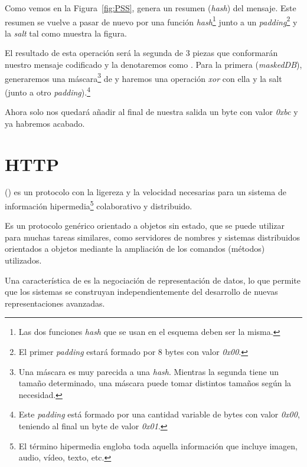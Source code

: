  Como vemos en la Figura~\ref{fig:PSS},  genera un resumen (\emph{hash}) del mensaje.
 Este resumen se vuelve a pasar de nuevo por una función \emph{hash}\footnote{Las dos funciones \emph{hash} que se usan en el esquema deben ser la misma.} junto a un \emph{padding}\footnote{El primer \emph{padding} estará formado por 8 bytes con valor \emph{0x00}.} y la \emph{salt} tal como muestra la figura.

 El resultado de esta operación será la segunda de 3 piezas que conformarán nuestro mensaje codificado y la denotaremos como .
 Para la primera (\emph{maskedDB}), generaremos una máscara\footnote{Una máscara es muy parecida a una \emph{hash}. Mientras la segunda tiene un tamaño determinado, una máscara puede tomar distintos tamaños según la necesidad.} de  y haremos una operación \emph{xor} con ella y la salt (junto a otro \emph{padding}).\footnote{Este \emph{padding} está formado por una cantidad variable de bytes con valor \emph{0x00}, teniendo al final un byte de valor \emph{0x01}.}

 Ahora solo nos quedará añadir al final de nuestra salida un byte con valor \emph{0xbc} y ya habremos acabado. \emph{\parencite{Reference17}}


 \section{HTTP}

  () es un protocolo con la ligereza y la velocidad necesarias para un sistema de información hipermedia\footnote{El término hipermedia engloba toda aquella información que incluye imagen, audio, vídeo, texto, etc.} colaborativo y distribuido.

 Es un protocolo genérico orientado a objetos sin estado, que se puede utilizar para muchas tareas similares, como servidores de nombres y sistemas distribuidos orientados a objetos mediante la ampliación de los comandos (métodos) utilizados.

 Una característica de  es la negociación de representación de datos, lo que permite que los sistemas se construyan independientemente del desarrollo de nuevas representaciones avanzadas. \emph{\parencite{Reference18}}
